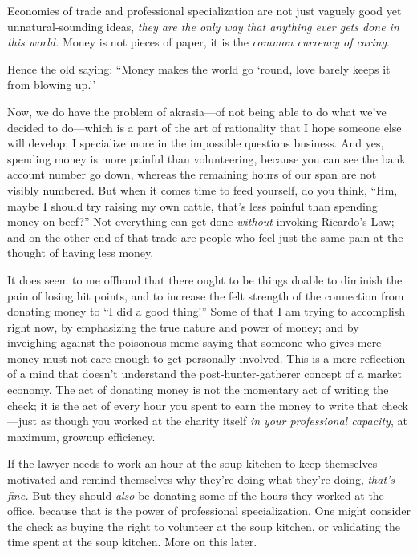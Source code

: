 {
 Economies of trade and professional specialization are not just
vaguely good yet unnatural-sounding ideas, \textit{they are the only
way that anything ever gets done in this world.} Money is not pieces of
paper, it is the \textit{common currency of caring}.}

{
 Hence the old saying: ``Money makes the world go
`round, love barely keeps it from blowing
up.''}

{
 Now, we do have the problem of akrasia---of not being able to do
what we've decided to do---which is a part of the art
of rationality that I hope someone else will develop; I specialize more
in the impossible questions business. And yes, spending money is more
painful than volunteering, because you can see the bank account number
go down, whereas the remaining hours of our span are not visibly
numbered. But when it comes time to feed yourself, do you think,
``Hm, maybe I should try raising my own cattle,
that's less painful than spending money on
beef?'' Not everything can get done \textit{without}
invoking Ricardo's Law; and on the other end of that
trade are people who feel just the same pain at the thought of having
less money.}

{
 It does seem to me offhand that there ought to be things doable to
diminish the pain of losing hit points, and to increase the felt
strength of the connection from donating money to ``I
did a good thing!'' Some of that I am trying to
accomplish right now, by emphasizing the true nature and power of
money; and by inveighing against the poisonous meme saying that someone
who gives mere money must not care enough to get personally involved.
This is a mere reflection of a mind that doesn't
understand the post-hunter-gatherer concept of a market economy. The
act of donating money is not the momentary act of writing the check; it
is the act of every hour you spent to earn the money to write that
check---just as though you worked at the charity itself \textit{in your
professional capacity}, at maximum, grownup efficiency.}

{
 If the lawyer needs to work an hour at the soup kitchen to keep
themselves motivated and remind themselves why they're
doing what they're doing,
\textit{that's fine.} But they should \textit{also} be
donating some of the hours they worked at the office, because that is
the power of professional specialization. One might consider the check
as buying the right to volunteer at the soup kitchen, or validating the
time spent at the soup kitchen. More on this later.}

